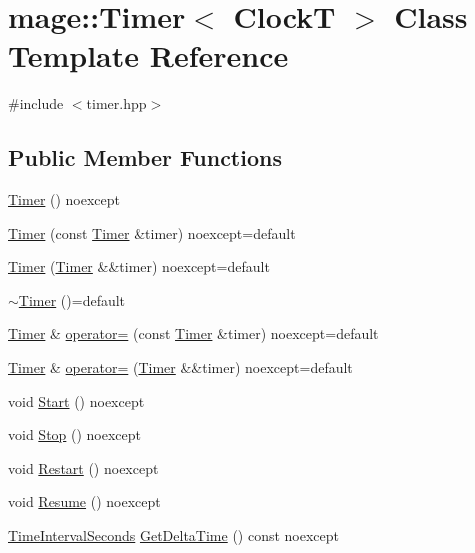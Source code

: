 \hypertarget{classmage_1_1_timer}{}\section{mage\+:\+:Timer$<$ ClockT $>$ Class Template Reference}
\label{classmage_1_1_timer}


{\ttfamily \#include $<$timer.\+hpp$>$}

\subsection*{Public Member Functions}
\begin{DoxyCompactItemize}
\item 
\mbox{\hyperlink{classmage_1_1_timer_afdc4024388d57bbdda74854ee8a11683}{Timer}} () noexcept
\item 
\mbox{\hyperlink{classmage_1_1_timer_a69aa4becb39ab40f378bd110db8ceb84}{Timer}} (const \mbox{\hyperlink{classmage_1_1_timer}{Timer}} \&timer) noexcept=default
\item 
\mbox{\hyperlink{classmage_1_1_timer_a7fb565cbe34c04df2713c43d3341cbc4}{Timer}} (\mbox{\hyperlink{classmage_1_1_timer}{Timer}} \&\&timer) noexcept=default
\item 
\mbox{\hyperlink{classmage_1_1_timer_a2802ae35dfdc05ff57b49e82f9b504f2}{$\sim$\+Timer}} ()=default
\item 
\mbox{\hyperlink{classmage_1_1_timer}{Timer}} \& \mbox{\hyperlink{classmage_1_1_timer_a2a8aefb272e02d8ba4a26058df80f119}{operator=}} (const \mbox{\hyperlink{classmage_1_1_timer}{Timer}} \&timer) noexcept=default
\item 
\mbox{\hyperlink{classmage_1_1_timer}{Timer}} \& \mbox{\hyperlink{classmage_1_1_timer_a39654f81efccc38a4cbe6164659407dd}{operator=}} (\mbox{\hyperlink{classmage_1_1_timer}{Timer}} \&\&timer) noexcept=default
\item 
void \mbox{\hyperlink{classmage_1_1_timer_a633908e9e816e9397cd93b65bc11ddb3}{Start}} () noexcept
\item 
void \mbox{\hyperlink{classmage_1_1_timer_ab9442d64c2c1bedec830004f292725ab}{Stop}} () noexcept
\item 
void \mbox{\hyperlink{classmage_1_1_timer_a54dab2d77f8beca30d52e8497e466988}{Restart}} () noexcept
\item 
void \mbox{\hyperlink{classmage_1_1_timer_a8464b2ea3fb3d97eac5ccb3a5b02e47b}{Resume}} () noexcept
\item 
\mbox{\hyperlink{namespacemage_a21c3d1575018d1e0720948713c76be1f}{Time\+Interval\+Seconds}} \mbox{\hyperlink{classmage_1_1_timer_afc09a5366735251b0586c56d8c92759a}{Get\+Delta\+Time}} () const noexcept

\end{DoxyCompactItemize}
